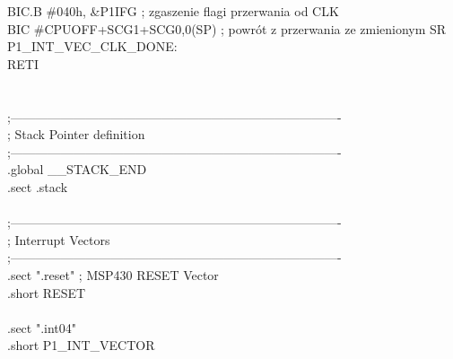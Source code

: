 \documentclass[a4paper,titlepage,11pt,floatssmall]{mwrep}
\begin{document}
        BIC.B \#040h, \&P1IFG             ; zgaszenie flagi przerwania od CLK\\
        BIC \#CPUOFF+SCG1+SCG0,0(SP)     ; powrót z przerwania ze zmienionym SR\\
P1\_{}INT\_{}VEC\_{}CLK\_{}DONE:\\
        RETI\\
\\
\\
;-------------------------------------------------------------------------------\\
; Stack Pointer definition\\
;-------------------------------------------------------------------------------\\
            .global \_{}\_{}STACK\_{}END\\
            .sect   .stack\\
\\
;-------------------------------------------------------------------------------\\
; Interrupt Vectors\\
;-------------------------------------------------------------------------------\\
            .sect   ".reset"                ; MSP430 RESET Vector\\
            .short  RESET\\
\\
            .sect ".int04"\\
            .short P1\_{}INT\_{}VECTOR 
            
       
\end{document}
